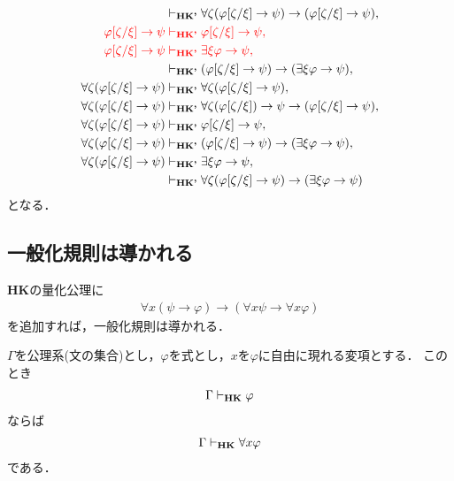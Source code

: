 	\begin{align}
		&\vdash_{{\scriptsize \mbox{{\bf HK'}}}} 
			\forall \zeta (\varphi[\zeta/\xi] \rightarrow \psi) 
			\rightarrow (\varphi[\zeta/\xi] \rightarrow \psi), \\
		\color{red}\varphi[\zeta/\xi] \rightarrow \psi &
		\color{red}\vdash_{{\scriptsize \mbox{{\bf HK'}}}}
			\varphi[\zeta/\xi] \rightarrow \psi, \\
		\color{red}\varphi[\zeta/\xi] \rightarrow \psi &
		\color{red}\vdash_{{\scriptsize \mbox{{\bf HK'}}}}
			\exists \xi \varphi \rightarrow \psi, \\
		&\vdash_{{\scriptsize \mbox{{\bf HK'}}}} (\varphi[\zeta/\xi] \rightarrow \psi) 
			\rightarrow (\exists \xi \varphi \rightarrow \psi), \\
		\forall \zeta (\varphi[\zeta/\xi] \rightarrow \psi)
			&\vdash_{{\scriptsize \mbox{{\bf HK'}}}} \forall \zeta (\varphi[\zeta/\xi] \rightarrow \psi), \\
		\forall \zeta (\varphi[\zeta/\xi] \rightarrow \psi)
			&\vdash_{{\scriptsize \mbox{{\bf HK'}}}} \forall \zeta (\varphi[\zeta/\xi]) \rightarrow \psi 
			\rightarrow (\varphi[\zeta/\xi] \rightarrow \psi), \\
		\forall \zeta (\varphi[\zeta/\xi] \rightarrow \psi)
			&\vdash_{{\scriptsize \mbox{{\bf HK'}}}} \varphi[\zeta/\xi] \rightarrow \psi, \\
		\forall \zeta (\varphi[\zeta/\xi] \rightarrow \psi)
			&\vdash_{{\scriptsize \mbox{{\bf HK'}}}} (\varphi[\zeta/\xi] \rightarrow \psi) 
			\rightarrow (\exists \xi \varphi \rightarrow \psi), \\
		\forall \zeta (\varphi[\zeta/\xi] \rightarrow \psi)
			&\vdash_{{\scriptsize \mbox{{\bf HK'}}}} \exists \xi \varphi \rightarrow \psi, \\
		&\vdash_{{\scriptsize \mbox{{\bf HK'}}}} \forall \zeta (\varphi[\zeta/\xi] \rightarrow \psi) 
		\rightarrow (\exists \xi \varphi \rightarrow \psi)
	\end{align}
	となる．
	
\subsection{一般化規則は導かれる}
	{\bf HK}の量化公理に
	\begin{align}
		\forall x (\psi \rightarrow \varphi) \rightarrow
		(\forall x \psi \rightarrow \forall x \varphi)
	\end{align}
	を追加すれば，一般化規則は導かれる．
	
	\begin{screen}
		$\Gamma$を公理系(文の集合)とし，$\varphi$を式とし，$x$を$\varphi$に自由に現れる変項とする．
		このとき
		\begin{align}
			\Gamma \vdash_{{\scriptsize \mbox{{\bf HK}}}} \varphi
		\end{align}
		ならば
		\begin{align}
			\Gamma \vdash_{{\scriptsize \mbox{{\bf HK}}}} \forall x \varphi
		\end{align}
		である．
	\end{screen}
	
